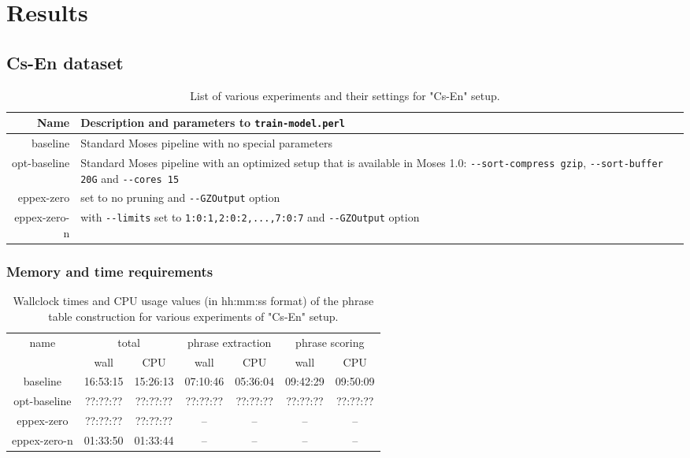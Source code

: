 \chapter{Results}
\label{chap:results}

\section{Cs-En dataset}

\begin{table}[ht]
\centering
\begin{tabular}{ r p{10cm} }
Name & Description and parameters to \verb|train-model.perl| \\
\hline
\hline
baseline & Standard Moses pipeline with no special parameters \\
opt-baseline & Standard Moses pipeline with an optimized setup that is
available in Moses 1.0:
\verb|--sort-compress gzip|, \verb|--sort-buffer 20G| and \verb|--cores 15| \\
eppex-zero & \eppex{} set to no pruning and \verb|--GZOutput| option \\
eppex-zero-n & \eppex{} with \verb|--limits| set to \verb|1:0:1,2:0:2,...,7:0:7|
and \verb|--GZOutput| option \\
\hline
\hline
\end{tabular}
\caption{\label{cs-en-wmt13-scenarios}List of various experiments and their
settings for "Cs-En" setup.}
\end{table}

\subsection{Memory and time requirements}

\begin{table}[ht]
\centering
\begin{tabular}{ | c | c c | c c | c c | }
\hline
name & \multicolumn{2}{|c|}{total} & \multicolumn{2}{|c|}{phrase extraction} & \multicolumn{2}{|c|}{phrase scoring} \\
 & wall & CPU & wall & CPU & wall & CPU \\
\hline
\hline
baseline     & 16:53:15 & 15:26:13 & 07:10:46 & 05:36:04 & 09:42:29 & 09:50:09 \\
opt-baseline & ??:??:?? & ??:??:?? & ??:??:?? & ??:??:?? & ??:??:?? & ??:??:?? \\ %
eppex-zero   & ??:??:?? & ??:??:?? & -- & -- & -- & -- \\ %
\hline
eppex-zero-n & 01:33:50 & 01:33:44 & -- & -- & -- & -- \\
\hline
\end{tabular}
\caption{\label{cs-en-wmt13-time-benchmarks}Wallclock times and CPU usage values
(in hh:mm:ss format) of the phrase table construction for various experiments
of "Cs-En" setup.}
\end{table}

